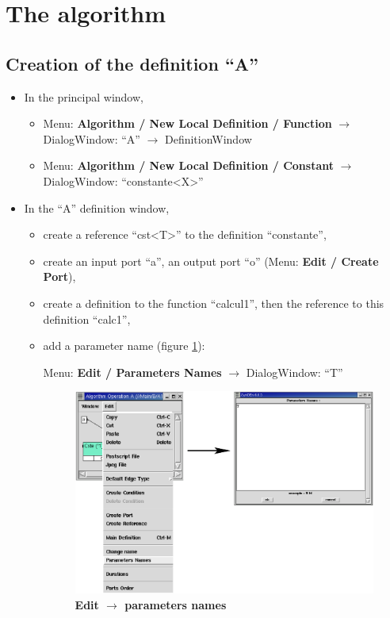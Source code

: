 \documentclass[a4paper,twoside]{report}
\begin{document}
\section{The algorithm}

\subsection{Creation of the definition ``A''}
\label{def_A}
\begin{itemize}
\item In the principal window,
\begin{itemize}
\item Menu: \textbf{Algorithm / New Local Definition / Function} $\rightarrow$
DialogWindow: ``A'' $\rightarrow$ DefinitionWindow
\item Menu: \textbf{Algorithm / New Local Definition / Constant} $\rightarrow$
DialogWindow: ``constante<X>''
\end{itemize}

\item In the ``A'' definition window,
\begin{itemize}
\item  create a reference ``cst<T>'' to the definition ``constante'',
\item create an input port ``a'', an output port ``o'' (Menu:
\textbf{Edit / Create Port}),
\item create a definition to the function ``calcul1'', then the reference to
this definition ``calc1'',

\item add a parameter name (figure \ref{parameter}): 

Menu: \textbf{Edit / Parameters Names} $\rightarrow$ DialogWindow: ``T''

\begin{figure}[htbp]
  \begin{center} 
        \includegraphics[width=\linewidth]{Edit_ParametersNames.eps} 
  \end{center}
  \caption{\textbf{Edit $\rightarrow$ parameters names}} 
  \label{parameter}
\end{figure}
\end{itemize}

\end{itemize}
\end{document}
